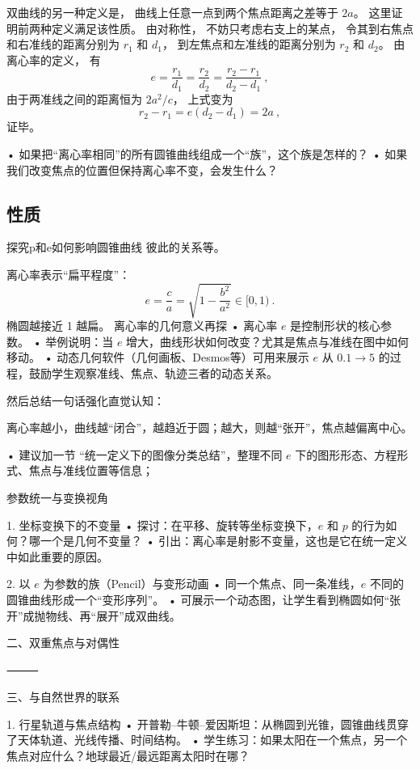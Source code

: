 双曲线的另一种定义是， 曲线上任意一点到两个焦点距离之差等于 $2a$。 这里证明前两种定义满足该性质。 由对称性， 不妨只考虑右支上的某点， 令其到右焦点和右准线的距离分别为 $r_1$ 和 $d_1$， 到左焦点和左准线的距离分别为 $r_2$ 和 $d_2$。 由离心率的定义， 有
\begin{equation}
e = \frac{r_1}{d_1} = \frac{r_2}{d_2} = \frac{r_2 - r_1}{d_2 - d_1}~,
\end{equation}
由于两准线之间的距离恒为 $2a^2/c$， 上式变为
\begin{equation}
r_2 - r_1 = e(d_2 - d_1) = 2a~,
\end{equation}
证毕。

	•	如果把“离心率相同”的所有圆锥曲线组成一个“族”，这个族是怎样的？
	•	如果我们改变焦点的位置但保持离心率不变，会发生什么？

\subsection{性质}

探究p和e如何影响圆锥曲线
彼此的关系等。

离心率表示“扁平程度”：
$$ e = \frac{c}{a} = \sqrt{1 - \frac{b^2}{a^2}} \in [0, 1) ~.$$
椭圆越接近 1 越扁。
离心率的几何意义再探
	•	离心率 $e$ 是控制形状的核心参数。
	•	举例说明：当 $e$ 增大，曲线形状如何改变？尤其是焦点与准线在图中如何移动。
	•	动态几何软件（几何画板、Desmos等）可用来展示 $e$ 从 $0.1 \to 5$ 的过程，鼓励学生观察准线、焦点、轨迹三者的动态关系。

然后总结一句话强化直觉认知：

离心率越小，曲线越“闭合”，越趋近于圆；越大，则越“张开”，焦点越偏离中心。

	•	建议加一节 “统一定义下的图像分类总结”，整理不同 $e$ 下的图形形态、方程形式、焦点与准线位置等信息；

参数统一与变换视角

1. 坐标变换下的不变量
	•	探讨：在平移、旋转等坐标变换下，$e$ 和 $p$ 的行为如何？哪一个是几何不变量？
	•	引出：离心率是射影不变量，这也是它在统一定义中如此重要的原因。

2. 以 $e$ 为参数的族（Pencil）与变形动画
	•	同一个焦点、同一条准线，$e$ 不同的圆锥曲线形成一个“变形序列”。
	•	可展示一个动态图，让学生看到椭圆如何“张开”成抛物线、再“展开”成双曲线。


二、双重焦点与对偶性



⸻

三、与自然世界的联系

1. 行星轨道与焦点结构
	•	开普勒–牛顿–爱因斯坦：从椭圆到光锥，圆锥曲线贯穿了天体轨道、光线传播、时间结构。
	•	学生练习：如果太阳在一个焦点，另一个焦点对应什么？地球最近/最远距离太阳时在哪？

